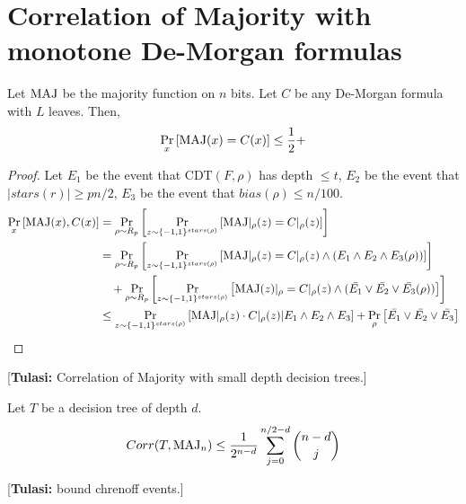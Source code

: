 \documentclass{article}
\newcommand{\cdt}{\mathrm{CDT}}
\newcommand{\tulasi}[1]{{\color{teal} [{\bf Tulasi:} #1]}}
\begin{document}
\section{Correlation of Majority with monotone De-Morgan formulas}
    \begin{theorem}
    \label{thm:corr with maj}
        Let $\mathrm{MAJ}$ be the majority function on $n$ bits. 
        Let $C$ be any De-Morgan formula with $L$ leaves. Then,
        $$\Pr_{x}\left[\mathrm{MAJ}(x) = C(x)\right] \leq \frac12 + $$
    \end{theorem}

    \begin{proof}
        Let $E_1$ be the event that $\cdt(F,\rho)$ has depth $\leq t$, $E_2$ be the event that $|stars(r)| \geq pn/2$, $E_3$ be the event that $bias(\rho) \leq n/100$.
        \begin{align*}
            \Pr_{x}\left[\mathrm{MAJ}(x),C(x)\right] &
                        = \Pr_{\rho \sim R_p}\left[\Pr_{z \sim \{-1,1\}^{stars(\rho)}}\left[\mathrm{MAJ}|_{\rho}(z) = C|_{\rho}(z)\right]\right] \\
                        &= \Pr_{\rho \sim R_p}\left[\Pr_{z \sim \{-1,1\}^{stars(\rho)}}\left[\mathrm{MAJ}|_\rho(z) = C|_\rho(z) \wedge (E_1 \wedge E_2 \wedge E_3(\rho))\right]\right]\\
                        &\hspace{10pt}+ \Pr_{\rho \sim R_p}\left[ \Pr_{z \sim \{-1,1\}^{stars(\rho)}}\left[\mathrm{MAJ}(z)|_\rho = C|_\rho(z) \wedge  (\bar{E_1} \vee \bar{E_2} \vee \bar{E_3}(\rho))\right]\right]\\
                        &\leq  \Pr_{z \sim \{-1,1\}^{stars(\rho)}}\left[\mathrm{MAJ}|_\rho(z)\cdot C|_\rho(z)| E_1 \wedge E_2 \wedge E_3\right] + \Pr_{\rho}\left[\bar{E_1} \vee \bar{E_2} \vee \bar{E_3}\right]
        \end{align*}
    \end{proof}
    
    
    
\tulasi{Correlation of Majority with small depth decision trees.}
\begin{claim}
    Let $T$ be a decision tree of depth $d$. 
        $$Corr(T,\mathrm{MAJ}_n) \leq \frac{1}{2^{n-d}}\sum_{j=0}^{n/2 -d} \binom{n-d}{j}$$
\end{claim}
\tulasi{bound chrenoff events.}
\end{document}

